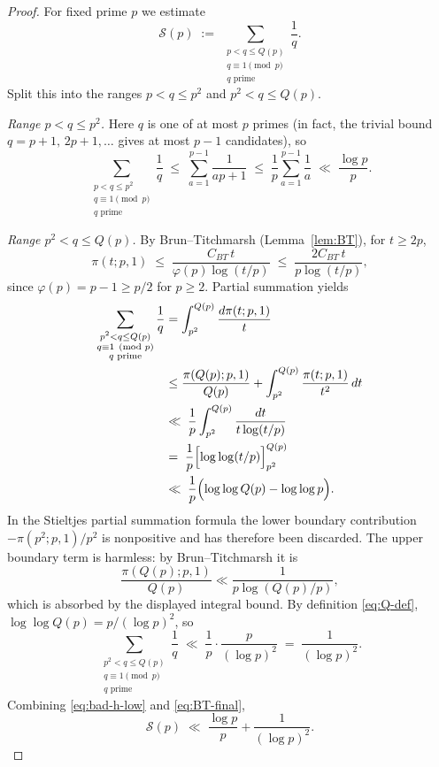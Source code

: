 \documentclass[11pt,reqno]{amsart}
\theoremstyle{plain}
\theoremstyle{definition}
\begin{document}
\begin{proof}
For fixed prime $p$ we estimate
\begin{equation}\label{eq:bad-prime-pair-S}
\mathcal{S}(p) \;:=\; \sum_{\substack{p<q\le Q(p)\\ q\equiv 1\pmod p\\ q\text{ prime}}}\frac{1}{q}.
\end{equation}
Split this into the ranges $p<q\le p^2$ and $p^2<q\le Q(p)$.

\emph{Range $p<q\le p^2$.} Here $q$ is one of at most $p$ primes (in fact, the
trivial bound $q=p+1,\,2p+1,\dots$ gives at most $p-1$ candidates), so
\begin{equation}\label{eq:bad-h-low}
\sum_{\substack{p<q\le p^2\\ q\equiv 1\pmod p\\ q\text{ prime}}}\frac{1}{q}
\;\le\; \sum_{a=1}^{p-1}\frac{1}{ap+1}
\;\le\; \frac{1}{p}\sum_{a=1}^{p-1}\frac1a
\;\ll\; \frac{\log p}{p}.
\end{equation}

\emph{Range $p^2<q\le Q(p)$.} By Brun--Titchmarsh (Lemma~\ref{lem:BT}), for
$t\ge 2p$,
\[
\pi(t;p,1) \;\le\; \frac{C_{BT}\,t}{\varphi(p)\log(t/p)}
\;\le\; \frac{2C_{BT}\,t}{p\log(t/p)},
\]
since $\varphi(p)=p-1\ge p/2$ for $p\ge 2$. Partial summation yields
\begin{align}
\sum_{\substack{p^2<q\le Q(p)\\ q\equiv 1\pmod p\\ q\text{ prime}}}\frac{1}{q}
&= \int_{p^2}^{Q(p)} \frac{d\pi(t;p,1)}{t}\nonumber\\
&\le \frac{\pi(Q(p);p,1)}{Q(p)} + \int_{p^2}^{Q(p)}\frac{\pi(t;p,1)}{t^2}\,dt\nonumber\\
&\ll\; \frac{1}{p}\int_{p^2}^{Q(p)} \frac{dt}{t\log(t/p)}\nonumber\\
&=\;\frac{1}{p}\Bigl[\log\log(t/p)\Bigr]_{p^2}^{Q(p)}\nonumber\\
&\ll\; \frac{1}{p}\Bigl(\log\log Q(p) - \log\log p\Bigr).\label{eq:BT-pre}
\end{align}
In the Stieltjes partial summation formula the lower boundary contribution
$-\pi(p^2;p,1)/p^2$ is nonpositive and has therefore been discarded. The upper
boundary term is harmless: by Brun--Titchmarsh it is
\[
\frac{\pi(Q(p);p,1)}{Q(p)}
\ll
\frac{1}{p\log(Q(p)/p)},
\]
which is absorbed by the displayed integral bound.
By definition \eqref{eq:Q-def}, $\log\log Q(p)= p/(\log p)^2$, so
\begin{equation}\label{eq:BT-final}
\sum_{\substack{p^2<q\le Q(p)\\ q\equiv 1\pmod p\\ q\text{ prime}}}\frac{1}{q}
\;\ll\; \frac{1}{p}\cdot\frac{p}{(\log p)^2}
\;=\; \frac{1}{(\log p)^2}.
\end{equation}
Combining \eqref{eq:bad-h-low} and \eqref{eq:BT-final},
\begin{equation}\label{eq:Sp-bound}
\mathcal{S}(p) \;\ll\; \frac{\log p}{p} + \frac{1}{(\log p)^2}.
\end{equation}


\end{proof}
\end{document}
